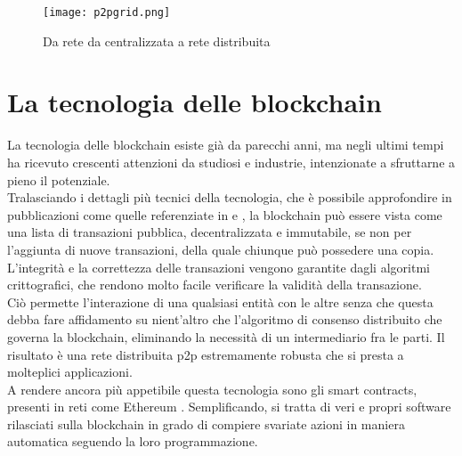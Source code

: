 \begin{figure}[h]
    \texttt{[image: p2pgrid.png]}
    \centering
    \caption{Da rete da centralizzata a rete distribuita \cite{img:p2pgrid}}
    \label{lab:p2pgrid}
\end{figure}


\section{La tecnologia delle blockchain}
La tecnologia delle blockchain esiste già da parecchi anni, ma negli ultimi tempi ha ricevuto crescenti attenzioni da studiosi e industrie, intenzionate a sfruttarne a pieno il potenziale. \\
Tralasciando i dettagli più tecnici della tecnologia, che è possibile approfondire in pubblicazioni come quelle referenziate in \cite{art:blockchain} e \cite{art:blockchain-for-industry}, 
la blockchain può essere vista come una lista di transazioni pubblica, decentralizzata e immutabile, se non per l'aggiunta di nuove transazioni, della quale chiunque può possedere una copia. \\
L'integrità e la correttezza delle transazioni vengono garantite dagli algoritmi crittografici, che rendono molto facile verificare la validità della transazione. \\
Ciò permette l'interazione di una qualsiasi entità con le altre senza che questa debba fare affidamento su nient'altro che l'algoritmo di consenso distribuito che governa la blockchain, eliminando la necessità di un intermediario fra le parti. 
Il risultato è una rete distribuita \gls{p2p} estremamente robusta che si presta a molteplici applicazioni. \\
A rendere ancora più appetibile questa tecnologia sono gli smart contracts, presenti in reti come Ethereum \cite{wiki:eth-smart-contracts}. Semplificando, si tratta di veri e propri software rilasciati sulla blockchain 
in grado di compiere svariate azioni in maniera automatica seguendo la loro programmazione.